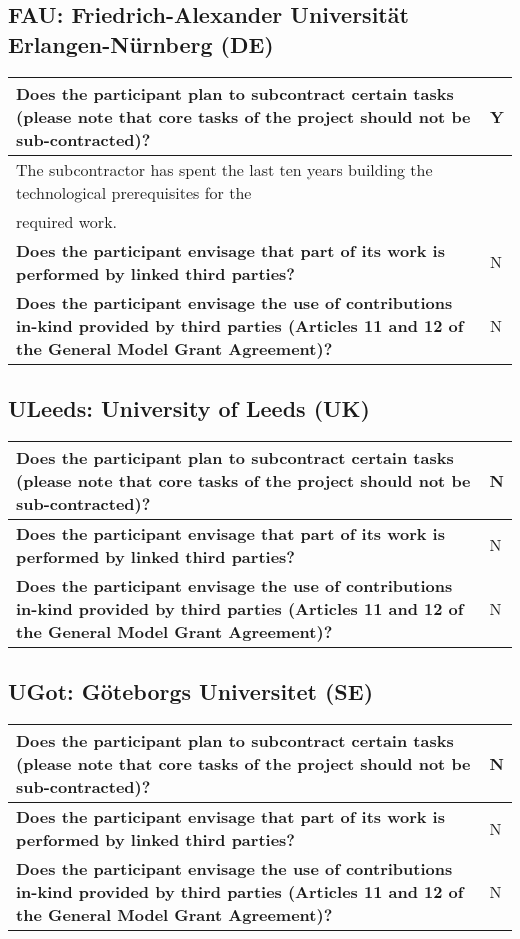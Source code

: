 \subsection{FAU: Friedrich-Alexander Universität Erlangen-Nürnberg (DE)}

\begin{longtable}{|p{}|p{}|}
\hline
{\bf Does the participant plan to subcontract certain tasks (please
  note that core tasks of the project should not be sub-contracted)?}
&
Y
\\
\hline
\multicolumn{2}{|l|}{The subcontractor has spent the last ten years building the technological
  prerequisites for the}\\
\multicolumn{2}{|l|}{required work. }
\\
\hline
{\bf Does the participant envisage that  part of its work is performed
  by linked third parties?}
&
N
\\
\hline
{\bf Does the participant envisage the use of contributions in-kind
provided by third parties (Articles 11 and 12 of the General Model
Grant Agreement)?}
&
N
\\
\hline
\end{longtable}

\subsection{ULeeds: University of Leeds (UK)}

\begin{longtable}{|p{}|p{}|}
\hline
{\bf Does the participant plan to subcontract certain tasks (please
  note that core tasks of the project should not be sub-contracted)?}
&
N
\\
\hline
{\bf Does the participant envisage that  part of its work is performed
  by linked third parties?}
&
N
\\
\hline
{\bf Does the participant envisage the use of contributions in-kind
provided by third parties (Articles 11 and 12 of the General Model
Grant Agreement)?}
&
N
\\
\hline
\end{longtable}


\subsection{UGot: Göteborgs Universitet (SE)}

\begin{longtable}{|p{}|p{}|}
\hline
{\bf Does the participant plan to subcontract certain tasks (please
  note that core tasks of the project should not be sub-contracted)?}
&
N
\\
\hline
{\bf Does the participant envisage that  part of its work is performed
  by linked third parties?}
&
N
\\
\hline
{\bf Does the participant envisage the use of contributions in-kind
provided by third parties (Articles 11 and 12 of the General Model
Grant Agreement)?}
&
N
\\
\hline
\end{longtable}

